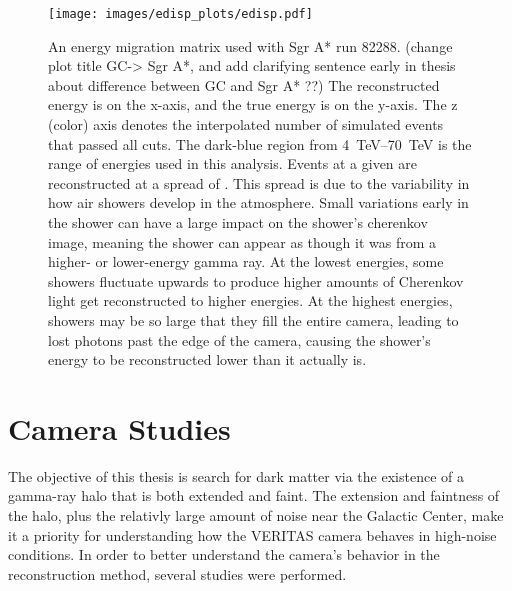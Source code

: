     \begin{figure}[!th]
      \centering
      \texttt{[image: images/edisp\_plots/edisp.pdf]}
      \caption[Energy Migration Matrix]{
        An energy migration matrix used with Sgr A* run 82288.
        {\color{red}(change plot title GC-> Sgr A*, and add clarifying sentence early in thesis about difference between GC and Sgr A* ??)}
        The reconstructed energy is on the x-axis, and the true energy is on the y-axis.
        The z (color) axis denotes the interpolated number of simulated events that passed all cuts.
        The dark-blue region from \SIrange{4}{70}{TeV} \EReco{} is the range of energies used in this analysis.
        Events at a given \ETrue{} are reconstructed at a spread of \EReco{}.
        This spread is due to the variability in how air showers develop in the atmosphere.
        Small variations early in the shower can have a large impact on the shower's cherenkov image, meaning the shower can appear as though it was from a higher- or lower-energy gamma ray.
        At the lowest \ETrue{} energies, some showers fluctuate upwards to produce higher amounts of Cherenkov light get reconstructed to higher \EReco{} energies.
        At the highest \ETrue{} energies, showers may be so large that they fill the entire camera, leading to lost photons past the edge of the camera, causing the shower's energy to be reconstructed lower than it actually is.
      }
      \label{fig:migmatrix}
    \end{figure}
  
  \FloatBarrier

\section{Camera Studies}
  The objective of this thesis is search for dark matter via the existence of a gamma-ray halo that is both extended and faint.
  The extension and faintness of the halo, plus the relativly large amount of noise near the Galactic Center, make it a priority for understanding how the VERITAS camera behaves in high-noise conditions.
  In order to better understand the camera's behavior in the reconstruction method, several studies were performed.

